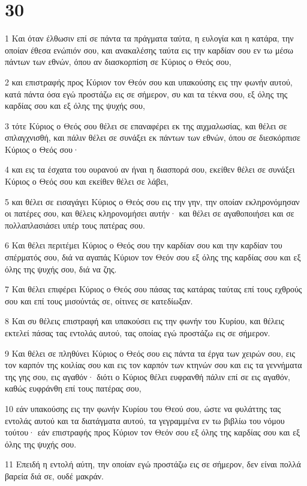 \chapter{30}

\par 1 Και όταν έλθωσιν επί σε πάντα τα πράγματα ταύτα, η ευλογία και η κατάρα, την οποίαν έθεσα ενώπιόν σου, και ανακαλέσης ταύτα εις την καρδίαν σου εν τω μέσω πάντων των εθνών, όπου αν διασκορπίση σε Κύριος ο Θεός σου,
\par 2 και επιστραφής προς Κύριον τον Θεόν σου και υπακούσης εις την φωνήν αυτού, κατά πάντα όσα εγώ προστάζω εις σε σήμερον, συ και τα τέκνα σου, εξ όλης της καρδίας σου και εξ όλης της ψυχής σου,
\par 3 τότε Κύριος ο Θεός σου θέλει σε επαναφέρει εκ της αιχμαλωσίας, και θέλει σε σπλαγχνισθή, και πάλιν θέλει σε συνάξει εκ πάντων των εθνών, όπου σε διεσκόρπισε Κύριος ο Θεός σου·
\par 4 και εις τα έσχατα του ουρανού αν ήναι η διασπορά σου, εκείθεν θέλει σε συνάξει Κύριος ο Θεός σου και εκείθεν θέλει σε λάβει,
\par 5 και θέλει σε εισαγάγει Κύριος ο Θεός σου εις την γην, την οποίαν εκληρονόμησαν οι πατέρες σου, και θέλεις κληρονομήσει αυτήν· και θέλει σε αγαθοποιήσει και σε πολλαπλασιάσει υπέρ τους πατέρας σου.
\par 6 Και θέλει περιτέμει Κύριος ο Θεός σου την καρδίαν σου και την καρδίαν του σπέρματός σου, διά να αγαπάς Κύριον τον Θεόν σου εξ όλης της καρδίας σου και εξ όλης της ψυχής σου, διά να ζης.
\par 7 Και θέλει επιφέρει Κύριος ο Θεός σου πάσας τας κατάρας ταύτας επί τους εχθρούς σου και επί τους μισούντάς σε, οίτινες σε κατεδίωξαν.
\par 8 Και συ θέλεις επιστραφή και υπακούσει εις την φωνήν του Κυρίου, και θέλεις εκτελεί πάσας τας εντολάς αυτού, τας οποίας εγώ προστάζω εις σε σήμερον.
\par 9 Και θέλει σε πληθύνει Κύριος ο Θεός σου εις πάντα τα έργα των χειρών σου, εις τον καρπόν της κοιλίας σου και εις τον καρπόν των κτηνών σου και εις τα γεννήματα της γης σου, εις αγαθόν· διότι ο Κύριος θέλει ευφρανθή πάλιν επί σε εις αγαθόν, καθώς ευφράνθη επί τους πατέρας σου,
\par 10 εάν υπακούσης εις την φωνήν Κυρίου του Θεού σου, ώστε να φυλάττης τας εντολάς αυτού και τα διατάγματα αυτού, τα γεγραμμένα εν τω βιβλίω του νόμου τούτου· εάν επιστραφής προς Κύριον τον Θεόν σου εξ όλης της καρδίας σου και εξ όλης της ψυχής σου.
\par 11 Επειδή η εντολή αύτη, την οποίαν εγώ προστάζω εις σε σήμερον, δεν είναι πολλά βαρεία διά σε, ουδέ μακράν.
